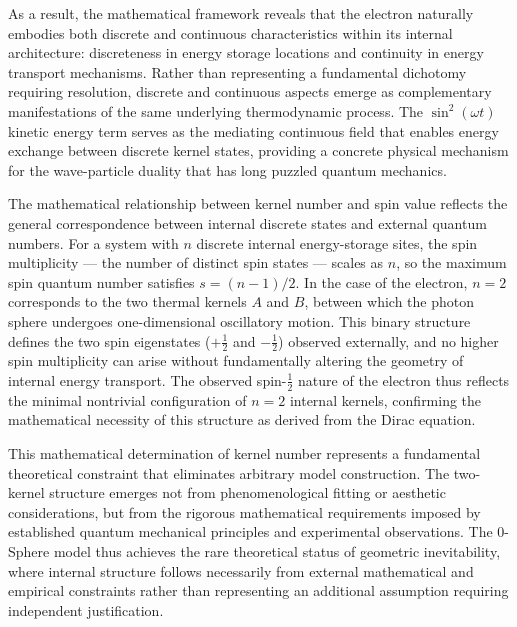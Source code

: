 \documentclass[%
 reprint,
 amsmath,amssymb,
 aps,
]{revtex4-1}
\numberwithin{equation}{section}%
\begin{document}
As a result, the mathematical framework reveals that the electron naturally embodies both discrete and continuous characteristics within its internal architecture: discreteness in energy storage locations and continuity in energy transport mechanisms. Rather than representing a fundamental dichotomy requiring resolution, discrete and continuous aspects emerge as complementary manifestations of the same underlying thermodynamic process. The $\sin^2(\omega t)$ kinetic energy term serves as the mediating continuous field that enables energy exchange between discrete kernel states, providing a concrete physical mechanism for the wave-particle duality that has long puzzled quantum mechanics.

The mathematical relationship between kernel number and spin value reflects the general correspondence between internal discrete states and external quantum numbers. For a system with $n$ discrete internal energy-storage sites, the spin multiplicity — the number of distinct spin states — scales as $n$, so the maximum spin quantum number satisfies $s = (n-1)/2$. In the case of the electron, $n = 2$ corresponds to the two thermal kernels $A$ and $B$, between which the photon sphere undergoes one-dimensional oscillatory motion. This binary structure defines the two spin eigenstates ($+\frac{1}{2}$ and $-\frac{1}{2}$) observed externally, and no higher spin multiplicity can arise without fundamentally altering the geometry of internal energy transport. The observed spin-$\frac{1}{2}$ nature of the electron thus reflects the minimal nontrivial configuration of $n = 2$ internal kernels, confirming the mathematical necessity of this structure as derived from the Dirac equation.

This mathematical determination of kernel number represents a fundamental theoretical constraint that eliminates arbitrary model construction. The two-kernel structure emerges not from phenomenological fitting or aesthetic considerations, but from the rigorous mathematical requirements imposed by established quantum mechanical principles and experimental observations. The 0-Sphere model thus achieves the rare theoretical status of geometric inevitability, where internal structure follows necessarily from external mathematical and empirical constraints rather than representing an additional assumption requiring independent justification.


\clearpage

\end{document}
